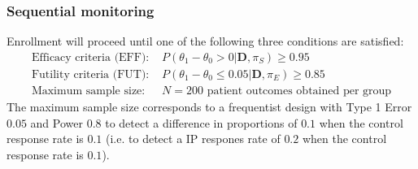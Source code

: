 \documentclass[12pt]{article}
\begin{document}
\subsubsection{Sequential monitoring}
Enrollment will proceed until one of the following three conditions are satisfied:
\begin{align*}
\text{Efficacy criteria (EFF): }&P(\theta_1-\theta_0>0|\mathbf{D},\pi_S)\geq 0.95\\
\text{Futility criteria (FUT): }&P(\theta_1-\theta_0 \leq 0.05|\mathbf{D},\pi_E)\geq 0.85\\
\text{Maximum sample size: }&N=200 \text{ patient outcomes obtained per group}
\end{align*}
The maximum sample size corresponds to a frequentist design with Type 1 Error $0.05$ and Power $0.8$ to detect a difference in proportions of $0.1$ when the control response rate is $0.1$ (i.e. to detect a IP respones rate of $0.2$ when the control response rate is $0.1$).
\end{document}
